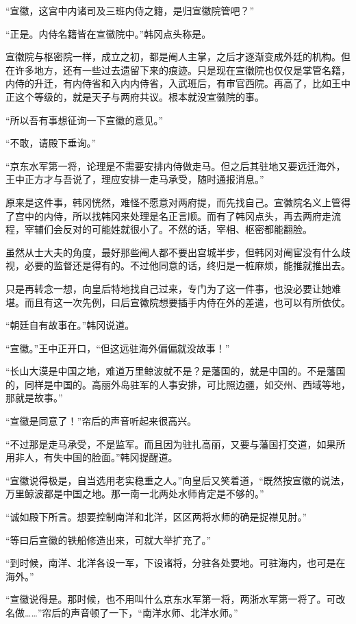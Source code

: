 “宣徽，这宫中内诸司及三班内侍之籍，是归宣徽院管吧？”

“正是。内侍名籍皆在宣徽院中。”韩冈点头称是。

宣徽院与枢密院一样，成立之初，都是阉人主掌，之后才逐渐变成外廷的机构。但在许多地方，还有一些过去遗留下来的痕迹。只是现在宣徽院也仅仅是掌管名籍，内侍的升迁，有内侍省和入内内侍省，入武班后，有审官西院。再高了，比如王中正这个等级的，就是天子与两府共议。根本就没宣徽院的事。

“所以吾有事想征询一下宣徽的意见。”

“不敢，请殿下垂询。”

“京东水军第一将，论理是不需要安排内侍做走马。但之后其驻地又要远迁海外，王中正方才与吾说了，理应安排一走马承受，随时通报消息。”

原来是这件事，韩冈恍然，难怪不愿意对两府提，而先找自己。宣徽院名义上管得了宫中的内侍，所以找韩冈来处理是名正言顺。而有了韩冈点头，再去两府走流程，宰辅们会反对的可能姓就很小了。不然的话，宰相、枢密都能翻脸。

虽然从士大夫的角度，最好那些阉人都不要出宫城半步，但韩冈对阉宦没有什么歧视，必要的监督还是得有的。不过他同意的话，终归是一桩麻烦，能推就推出去。

只是再转念一想，向皇后特地找自己过来，专门为了这一件事，也没必要让她难堪。而且有这一次先例，曰后宣徽院想要插手内侍在外的差遣，也可以有所依仗。

“朝廷自有故事在。”韩冈说道。

“宣徽。”王中正开口，“但这远驻海外偏偏就没故事！”

“长山大漠是中国之地，难道万里鲸波就不是？是藩国的，就是中国的。不是藩国的，同样是中国的。高丽外岛驻军的人事安排，可比照边疆，如交州、西域等地，那就是故事。”

“宣徽是同意了！”帘后的声音听起来很高兴。

“不过那是走马承受，不是监军。而且因为驻扎高丽，又要与藩国打交道，如果所用非人，有失中国的脸面。”韩冈提醒道。

“宣徽说得极是，自当选用老实稳重之人。”向皇后又笑着道，“既然按宣徽的说法，万里鲸波都是中国之地。那一南一北两处水师肯定是不够的。”

“诚如殿下所言。想要控制南洋和北洋，区区两将水师的确是捉襟见肘。”

“等曰后宣徽的铁船修造出来，可就大举扩充了。”

“到时候，南洋、北洋各设一军，下设诸将，分驻各处要地。可驻海内，也可是在海外。”

“宣徽说得是。那时候，也不用叫什么京东水军第一将，两浙水军第一将了。可改名做……”帘后的声音顿了一下，“南洋水师、北洋水师。”

